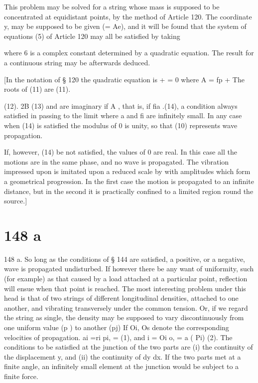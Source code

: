 This problem may be solved for a string whose mass is supposed to be
concentrated at equidistant points, by the method of Article 120. The
coordinate y, may be supposed to be given (= Ae), and it will be found
that the system of equations (5) of Article 120 may all be satisfied by
taking

where 6 is a complex constant determined by a quadratic equation. The
result for a continuous string may be afterwards deduced.

{[}In the notation of § 120 the quadratic equation is + = 0 where
A = fp +
The roots of (11) are (11).

(12). 2B (13) and are imaginary if A , that is, if fia .(14),
a condition always satisfied in passing to the limit where a and fi are
infinitely small. In any case when (14) is satisfied the modulus of 0 is
unity, so that (10) represents wave propagation.

If, however, (14) be not satisfied, the values of 0 are real. In this
case all the motions are in the same phase, and no wave is propagated.
The vibration impressed upon is imitated upon
a reduced scale by with amplitudes which form a
geometrical progression. In the first case the motion is propagated to
an infinite distance, but in the second it is practically confined to a
limited region round the source.{]}

\section{148 a}\label{sect:148a}
148 a.
So long as the conditions of § 144 are satisfied, a positive, or a
negative, wave is propagated undisturbed. If however there be any want
of uniformity, such (for example) as that caused by a load attached at a
particular point, reflection will ensue when that point is reached. The
most interesting problem under this head is that of two strings of
different longitudinal densities, attached to one another, and vibrating
transversely under the common tension.  Or, if we regard the string as
single, the density may be supposed to vary discontinuously from one
uniform value (p ) to another (pj) If Oi, Os denote the corresponding
velocities of propagation. ai =ri pi, = (1),
and i = Oi o, = a ( Pi) (2). The conditions to be satisfied at the
junction of the two parts are (i) the continuity of the displacement y,
and (ii) the continuity of dy dx. If the two parts met at a finite
angle, an infinitely small element at the junction would be subject to a
finite force.

